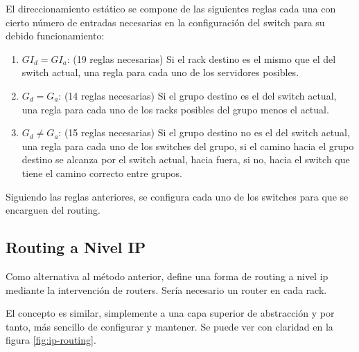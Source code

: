 \documentclass[%
    school=etsisi,%
    degree=61TI,%
]{upm-report}
\begin{document}
El direccionamiento estático se compone de las siguientes reglas cada una con cierto número de entradas necesarias en la configuración del switch para su debido funcionamiento:

\begin{enumerate}
    \item $GI_d = GI_a$: (19 reglas necesarias) Si el rack destino es el mismo que el del switch actual, una regla  para cada uno de los servidores posibles.
    \item $G_d = G_a$: (14 reglas necesarias) Si el grupo destino es el del switch actual, una regla para cada uno de los racks posibles del grupo menos el actual.
    \item $G_d \neq G_a$: (15 reglas necesarias) Si el grupo destino no es el del switch actual, una regla para cada uno de los switches del grupo, si el camino hacia el grupo destino se alcanza por el switch actual, hacia fuera, si no, hacia el switch que tiene el camino correcto entre grupos.
\end{enumerate}

Siguiendo las reglas anteriores, se configura cada uno de los switches para que se encarguen del routing.

\subsection{Routing a Nivel IP}
\label{subsec:routing-nivel-ip}

Como alternativa al método anterior, define una forma de routing a nivel ip mediante la intervención de routers. Sería necesario un router en cada rack.

El concepto es similar, simplemente a una capa superior de abstracción y por tanto, más sencillo de configurar y mantener. Se puede ver con claridad en la figura \ref{fig:ip-routing}.
\end{document}
